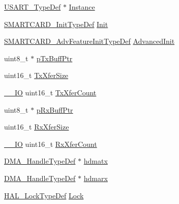 \begin{DoxyCompactItemize}
\item 
\hyperlink{struct_u_s_a_r_t___type_def}{U\+S\+A\+R\+T\+\_\+\+Type\+Def} $\ast$ \hyperlink{struct_s_m_a_r_t_c_a_r_d___handle_type_def_a2b30b6d22df80fbebd8ceefc6f162310}{Instance}
\item 
\hyperlink{struct_s_m_a_r_t_c_a_r_d___init_type_def}{S\+M\+A\+R\+T\+C\+A\+R\+D\+\_\+\+Init\+Type\+Def} \hyperlink{struct_s_m_a_r_t_c_a_r_d___handle_type_def_a39d2878266054c3b9cf945ef6416a2ca}{Init}
\item 
\hyperlink{struct_s_m_a_r_t_c_a_r_d___adv_feature_init_type_def}{S\+M\+A\+R\+T\+C\+A\+R\+D\+\_\+\+Adv\+Feature\+Init\+Type\+Def} \hyperlink{struct_s_m_a_r_t_c_a_r_d___handle_type_def_a061d77764f1e674b0dde9823245948ee}{Advanced\+Init}
\item 
uint8\+\_\+t $\ast$ \hyperlink{struct_s_m_a_r_t_c_a_r_d___handle_type_def_a5cc31f7c52dafd32f27f8f2756dbf343}{p\+Tx\+Buff\+Ptr}
\item 
uint16\+\_\+t \hyperlink{struct_s_m_a_r_t_c_a_r_d___handle_type_def_a80907b65d6f9541bc0dee444d16bc45b}{Tx\+Xfer\+Size}
\item 
\hyperlink{core__sc300_8h_aec43007d9998a0a0e01faede4133d6be}{\+\_\+\+\_\+\+IO} uint16\+\_\+t \hyperlink{struct_s_m_a_r_t_c_a_r_d___handle_type_def_a1823437fbed80bdd1510782ced4e5532}{Tx\+Xfer\+Count}
\item 
uint8\+\_\+t $\ast$ \hyperlink{struct_s_m_a_r_t_c_a_r_d___handle_type_def_a7cee540cb21048ac48ba17355440e668}{p\+Rx\+Buff\+Ptr}
\item 
uint16\+\_\+t \hyperlink{struct_s_m_a_r_t_c_a_r_d___handle_type_def_ac12f5f1f6295b3c3327d5feabf5a96fb}{Rx\+Xfer\+Size}
\item 
\hyperlink{core__sc300_8h_aec43007d9998a0a0e01faede4133d6be}{\+\_\+\+\_\+\+IO} uint16\+\_\+t \hyperlink{struct_s_m_a_r_t_c_a_r_d___handle_type_def_ad95a26d6b12b7087bba3d1b769175db2}{Rx\+Xfer\+Count}
\item 
\hyperlink{group___d_m_a___exported___types_ga92b907d56a9c29b93d46782a7a04f91e}{D\+M\+A\+\_\+\+Handle\+Type\+Def} $\ast$ \hyperlink{struct_s_m_a_r_t_c_a_r_d___handle_type_def_a33e13c28b1a70e6164417abb026d7a22}{hdmatx}
\item 
\hyperlink{group___d_m_a___exported___types_ga92b907d56a9c29b93d46782a7a04f91e}{D\+M\+A\+\_\+\+Handle\+Type\+Def} $\ast$ \hyperlink{struct_s_m_a_r_t_c_a_r_d___handle_type_def_abd0aeec20298a55d89a440320e35634f}{hdmarx}
\item 
\hyperlink{stm32f0xx__hal__def_8h_ab367482e943333a1299294eadaad284b}{H\+A\+L\+\_\+\+Lock\+Type\+Def} \hyperlink{struct_s_m_a_r_t_c_a_r_d___handle_type_def_ad4cf225029dbefe8d3fe660c33b8bb6b}{Lock}

\end{DoxyCompactItemize}
